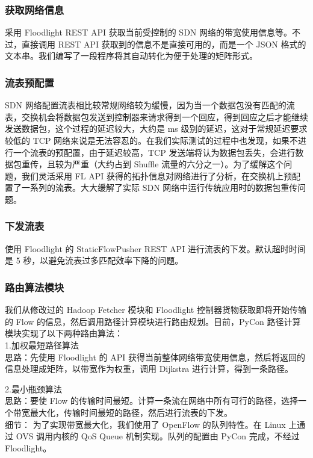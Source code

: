 \documentclass[a4paper, 11pt]{article}                                                   %
\begin{document}
\begin{CJK*}{UTF8}{song}
\subsubsection{获取网络信息}
采用 Floodlight REST API 获取当前受控制的 SDN 网络的带宽使用信息等。不过，直接调用 REST API 获取到的信息不是直接可用的，而是一个 JSON 格式的文本串。我们编写了一段程序将其自动转化为便于处理的矩阵形式。

\subsubsection{流表预配置}
SDN 网络配置流表相比较常规网络较为缓慢，因为当一个数据包没有匹配的流表，交换机会将数据包发送到控制器来请求得到一个回应，得到回应之后才能继续发送数据包，这个过程的延迟较大，大约是 ms 级别的延迟，这对于常规延迟要求较低的 TCP 网络来说是无法容忍的。在我们实际测试的过程中也发现，如果不进行一个流表的预配置，由于延迟较高，TCP 发送端将认为数据包丢失，会进行数据包重传，且较为严重（大约占到 Shuffle 流量的六分之一）。为了缓解这个问题，我们灵活采用 FL API 获得的拓扑信息对网络进行了分析，在交换机上预配置了一系列的流表。大大缓解了实际 SDN 网络中运行传统应用时的数据包重传问题。

\subsubsection{下发流表}
使用 Floodlight 的 StaticFlowPusher REST API 进行流表的下发。默认超时时间是 5 秒，以避免流表过多匹配效率下降的问题。

\subsubsection{路由算法模块}
我们从修改过的 Hadoop Fetcher 模块和 Floodlight 控制器货物获取即将开始传输的 Flow 的信息，然后调用路径计算模块进行路由规划。目前，PyCon 路径计算模块实现了以下两种路由算法：\\

1.加权最短路径算法\\
思路：先使用 Floodlight 的 API 获得当前整体网络带宽使用信息，然后将返回的信息处理成矩阵，以带宽作为权重，调用 Dijkstra 进行计算，得到一条路径。\\
\bigskip

2.最小瓶颈算法\\
思路：要使 Flow 的传输时间最短。计算一条流在网络中所有可行的路径，选择一个带宽最大化，传输时间最短的路径，然后进行流表的下发。\\

细节：
为了实现带宽最大化，我们使用了 OpenFlow 的队列特性。在 Linux 上通过 OVS 调用内核的 QoS Queue 机制实现。队列的配置由 PyCon 完成，不经过 Floodlight。


\end{CJK*}
\end{document}
